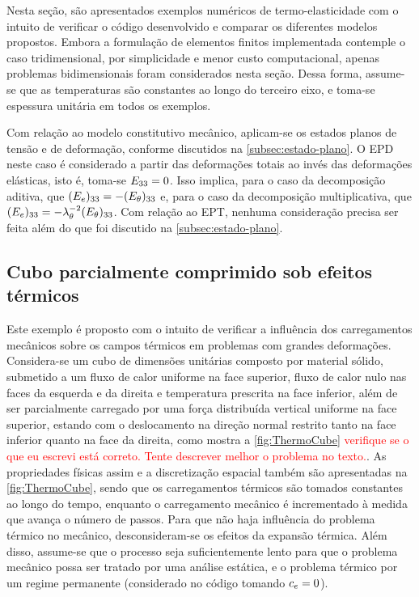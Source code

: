 \documentclass[Tese.tex]{subfiles}
\begin{document}
Nesta seção, são apresentados exemplos numéricos de termo-elasticidade com o intuito de verificar o código desenvolvido e comparar os diferentes modelos propostos. Embora a formulação de elementos finitos implementada contemple o caso tridimensional, por simplicidade e menor custo computacional, apenas problemas bidimensionais foram considerados nesta seção. Dessa forma, assume-se que as temperaturas são constantes ao longo do terceiro eixo, e toma-se espessura unitária em todos os exemplos. 

Com relação ao modelo constitutivo mecânico, aplicam-se os estados planos de tensão e de deformação, conforme discutidos na \autoref{subsec:estado-plano}. O EPD neste caso é considerado a partir das deformações totais ao invés das deformações elásticas, isto é, toma-se ${E}_{33}=0$. Isso implica, para o caso da decomposição aditiva, que $({E}_e)_{33}=-({E}_{\theta})_{33}$ e, para o caso da decomposição multiplicativa, que $({E}_e)_{33}=-\lambda_{\theta}^{-2}({E}_{\theta})_{33}$. Com relação ao EPT, nenhuma consideração precisa ser feita além do que foi discutido na \autoref{subsec:estado-plano}.

\subsection{Cubo parcialmente comprimido sob efeitos térmicos}\label{subsec:thermoCube}

Este exemplo é proposto com o intuito de verificar a influência dos carregamentos mecânicos sobre os campos térmicos em problemas com grandes deformações. Considera-se um cubo de dimensões unitárias composto por material sólido, submetido a um fluxo de calor uniforme na face superior, fluxo de calor nulo nas faces da esquerda e da direita e temperatura prescrita na face inferior, além de ser parcialmente carregado por uma força distribuída vertical uniforme na face superior, estando com o deslocamento na direção normal restrito tanto na face inferior quanto na face da direita, como mostra a \autoref{fig:ThermoCube} \textcolor{red}{verifique se o que eu escrevi está correto. Tente descrever melhor o problema no texto.}. As propriedades físicas assim e a discretização espacial também são apresentadas na  \autoref{fig:ThermoCube}, sendo que os carregamentos térmicos são tomados constantes ao longo do tempo, enquanto o carregamento mecânico é incrementado à medida que avança o número de passos. Para que não haja influência do problema térmico no mecânico, desconsideram-se os efeitos da expansão térmica. Além disso, assume-se que o processo seja suficientemente lento para que o problema mecânico possa ser tratado por uma análise estática, e o problema térmico por um regime permanente (considerado no código tomando $c_e=0$).
\end{document}
